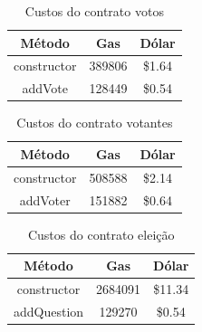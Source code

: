 \documentclass{ufsctex/ufsctex}
\begin{document}
\begin{table}[]
\centering
\begin{tabular}{|c|c|c|}
\hline
Método      & Gas    & Dólar  \\ \hline
constructor & 389806 & \$1.64 \\ \hline
addVote     & 128449 & \$0.54 \\ \hline
\end{tabular}
\caption{Custos do contrato votos}
\label{tab:my-table}
\end{table}

\begin{table}[]
\centering
\begin{tabular}{|c|c|c|}
\hline
Método      & Gas    & Dólar  \\ \hline
constructor & 508588 & \$2.14 \\ \hline
addVoter    & 151882 & \$0.64 \\ \hline
\end{tabular}
\caption{Custos do contrato votantes}
\label{tab:my-table}
\end{table}

\begin{table}[]
\centering
\begin{tabular}{|c|c|c|}
\hline
Método      & Gas     & Dólar   \\ \hline
constructor & 2684091 & \$11.34 \\ \hline
addQuestion & 129270  & \$0.54  \\ \hline
\end{tabular}
\caption{Custos do contrato eleição}
\label{tab:my-table}
\end{table}




\end{document}
